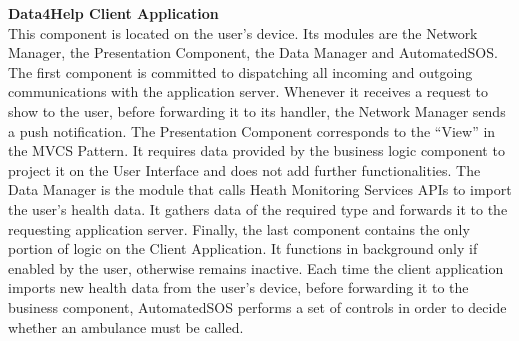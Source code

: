 \documentclass[titlepage]{article}
\begin{document}
{\bf Data4Help Client Application }\\ 
This component is located on the user’s device. Its modules are the Network Manager, the Presentation Component, the Data Manager and AutomatedSOS. 
The first component is committed to dispatching all incoming and outgoing communications with the application server. Whenever it receives a request to show to the user, before forwarding it to its handler, the Network Manager sends a push notification.
The Presentation Component corresponds to the “View” in the MVCS Pattern. It requires data provided by the business logic component to project it on the User Interface and does not add further functionalities. 
The Data Manager is the module that calls Heath Monitoring Services APIs to import the user’s health data. It gathers data of the required type and forwards it to the requesting application server.
Finally, the last component contains the only portion of logic on the Client Application. It functions in background only if enabled by the user, otherwise remains inactive. Each time the client application imports new health data from the user’s device, before forwarding it to the business component, AutomatedSOS performs a set of controls in order to decide whether an ambulance must be called. \\
\end{document}
